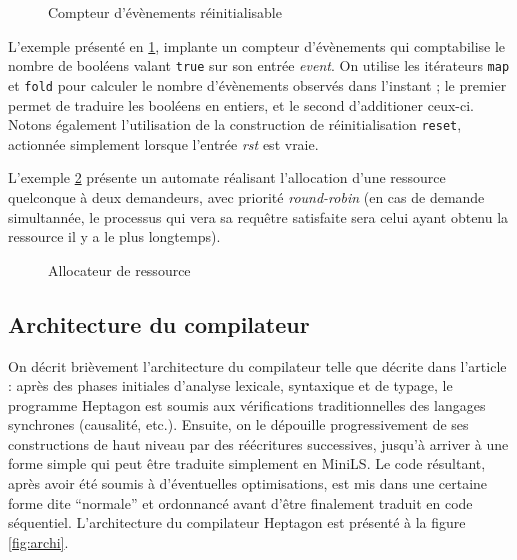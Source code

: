 \documentclass[9pt,a4paper]{article}
\newcommand{\LANG}{Heptagon}
\begin{document}
\begin{figure}[htp]
  \centering
  
  \caption{Compteur d'évènements réinitialisable}
  \label{fig:ex_count}
\end{figure}

L'exemple présenté en \ref{fig:ex_count}, implante un compteur d'évènements qui
comptabilise le nombre de booléens valant \texttt{true} sur son entrée
\textit{event}. On utilise les itérateurs \texttt{map} et \texttt{fold} pour
calculer le nombre d'évènements observés dans l'instant ; le premier permet de
traduire les booléens en entiers, et le second d'additioner ceux-ci. Notons
également l'utilisation de la construction de réinitialisation \texttt{reset},
actionnée simplement lorsque l'entrée \textit{rst} est vraie.

L'exemple \ref{fig:ex_alloc} présente un automate réalisant l'allocation d'une
ressource quelconque à deux demandeurs, avec priorité \textit{round-robin} (en
cas de demande simultannée, le processus qui vera sa requêtre satisfaite sera
celui ayant obtenu la ressource il y a le plus longtemps).

\begin{figure}[htp]
  \centering
  
  \caption{Allocateur de ressource}
  \label{fig:ex_alloc}
\end{figure}

\subsection{Architecture du compilateur}

On décrit brièvement l'architecture du compilateur telle que décrite dans
l'article \cite{lctes08a} : après des phases initiales d'analyse lexicale,
syntaxique et de typage, le programme \LANG{} est soumis aux vérifications
traditionnelles des langages synchrones (causalité, etc.). Ensuite, on le
dépouille progressivement de ses constructions de haut niveau par des
réécritures successives, jusqu'à arriver à une forme simple qui peut être
traduite simplement en MiniLS. Le code résultant, après avoir été soumis à
d'éventuelles optimisations, est mis dans une certaine forme dite ``normale'' et
ordonnancé avant d'être finalement traduit en code séquentiel. L'architecture du
compilateur \LANG{} est présenté à la figure \ref{fig:archi}.
\end{document}

